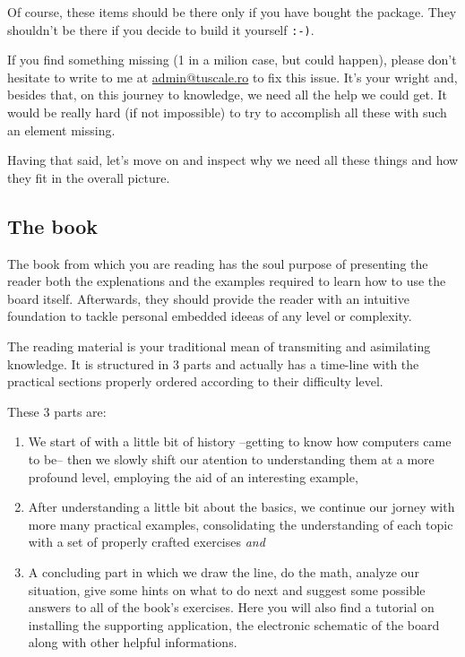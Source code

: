 \documentclass[12pt, a4paper]{book}
\begin{document}
Of course, these items should be there only if you have bought the package. They shouldn't be there if you decide to build it yourself \texttt{:-)}.

If you find something missing (1 in a milion case, but could happen), please don't hesitate to write to me at \href{mailto:admin@tuscale.ro}{admin@tuscale.ro} to fix this issue. It's your wright and, besides that, on this journey to knowledge, we need all the help we could get. It would be really hard (if not impossible) to try to accomplish all these with such an element missing. 

Having that said, let's move on and inspect why we need all these things and how they fit in the overall picture. 

\subsection{The book}

The book from which you are reading has the soul purpose of presenting the reader both the explenations and the examples required to learn how to use the board itself. Afterwards, they should provide the reader with an intuitive foundation to tackle personal embedded ideeas of any level or complexity. 

The reading material is your traditional mean of transmiting and asimilating knowledge. It is structured in 3 parts and actually has a time-line with the practical sections properly ordered according to their difficulty level.

These 3 parts are:
\begin{enumerate}
  \item We start of with a little bit of history --getting to know how computers came to be-- then we slowly shift our atention to understanding them at a more profound level, employing the aid of an interesting example,
  \item After understanding a little bit about the basics, we continue our jorney with more many practical examples, consolidating the understanding of each topic with a set of properly crafted exercises \textit{and}
  \item A concluding part in which we draw the line, do the math, analyze our situation, give some hints on what to do next and suggest some possible answers to all of the book's exercises. Here you will also find a tutorial on installing the supporting application, the electronic schematic of the board along with other helpful informations.
\end{enumerate} 
\end{document}

